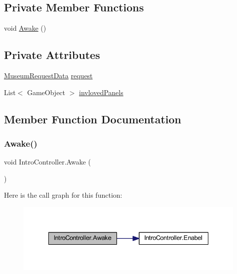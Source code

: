 \subsection*{Private Member Functions}
\begin{DoxyCompactItemize}
\item 
void \mbox{\hyperlink{class_intro_controller_a2e454b9889a5f12aae6f0b9ada1534e8}{Awake}} ()
\end{DoxyCompactItemize}
\subsection*{Private Attributes}
\begin{DoxyCompactItemize}
\item 
\mbox{\hyperlink{class_museum_request_data}{Museum\+Request\+Data}} \mbox{\hyperlink{class_intro_controller_a06727e6268f720c81ec061f6ff1faa88}{request}}
\item 
List$<$ Game\+Object $>$ \mbox{\hyperlink{class_intro_controller_aa4a4ba4580a40af426f5b210a0c13617}{invloved\+Panels}}
\end{DoxyCompactItemize}


\subsection{Member Function Documentation}
\mbox{\label{class_intro_controller_a2e454b9889a5f12aae6f0b9ada1534e8}} 
\subsubsection{\texorpdfstring{Awake()}{Awake()}}
{\footnotesize\ttfamily void Intro\+Controller.\+Awake (\begin{DoxyParamCaption}{ }\end{DoxyParamCaption})\hspace{0.3cm}{\ttfamily [private]}}

Here is the call graph for this function\+:
\nopagebreak
\begin{figure}[H]
\begin{center}
\leavevmode
\includegraphics[width=335pt]{class_intro_controller_a2e454b9889a5f12aae6f0b9ada1534e8_cgraph}
\end{center}
\end{figure}
\mbox{\label{class_intro_controller_af189f110e2a1fc56f21c2e5d91af849f}} 
